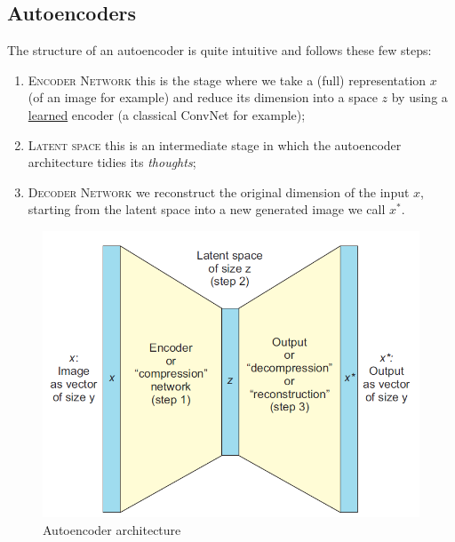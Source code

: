 \subsection{Autoencoders}
The structure of an autoencoder is quite intuitive and follows these few steps: 
\begin{enumerate}
    \itemsep-0.3em
    \item \textsc{Encoder Network} this is the stage where we take a (full) representation $x$ (of an image for example) and reduce its dimension into a space $z$ by using a \underline{learned} encoder (a  classical ConvNet for example); 
    \item \textsc{Latent space} this is an intermediate stage in which the autoencoder architecture tidies its \textit{thoughts}; 
    \item \textsc{Decoder Network} we reconstruct the original dimension of the input $x$, starting from the latent space into a new generated image we call $x^*$.
\end{enumerate}

\begin{figure}
    \centering
    \includegraphics[scale=0.5]{img/autoencoder.png}
    \caption{Autoencoder architecture}
\end{figure}

